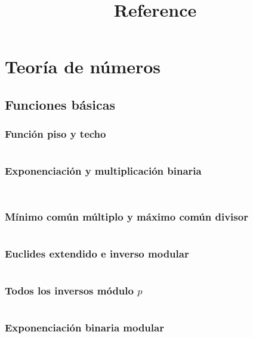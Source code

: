 \documentclass[11pt]{article}
\title{Reference}
\begin{document}
	\tableofcontents
	
	\clearpage
	\section{Teoría de números}
		\subsection{Funciones básicas}
			\subsubsection{Función piso y techo}
			\inputminted[tabsize=2,breaklines,firstline=5,lastline=21,fontsize=\small]{c++}{numberTheory.cpp}
			
			\subsubsection{Exponenciación y multiplicación binaria}
			\inputminted[tabsize=2,breaklines,firstline=23,lastline=46,fontsize=\small]{c++}{numberTheory.cpp}
			\inputminted[tabsize=2,breaklines,firstline=1041,lastline=1047,fontsize=\small]{c++}{numberTheory.cpp}
			
			\subsubsection{Mínimo común múltiplo y máximo común divisor}
			\inputminted[tabsize=2,breaklines,firstline=48,lastline=68,fontsize=\small]{c++}{numberTheory.cpp}
			
			\subsubsection{Euclides extendido e inverso modular}
			\inputminted[tabsize=2,breaklines,firstline=70,lastline=91,fontsize=\small]{c++}{numberTheory.cpp}
			
			\subsubsection{Todos los inversos módulo $p$}
			\inputminted[tabsize=2,breaklines,firstline=711,lastline=718,fontsize=\small]{c++}{numberTheory.cpp}
			
			\subsubsection{Exponenciación binaria modular}
			\inputminted[tabsize=2,breaklines,firstline=93,lastline=106,fontsize=\small]{c++}{numberTheory.cpp}
			
\end{document}
